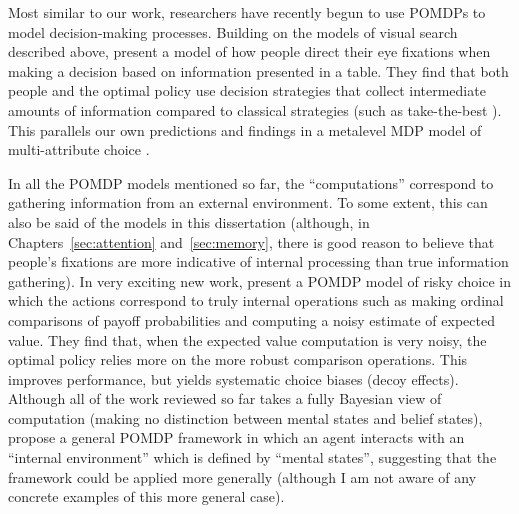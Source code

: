 Most similar to our work, researchers have recently begun to use POMDPs to model decision-making processes. Building on the models of visual search described above, \citet{chen2017cognitive} present a model of how people direct their eye fixations when making a decision based on information presented in a table. They find that both people and the optimal policy use decision strategies that collect intermediate amounts of information compared to classical strategies (such as take-the-best \citealp{gigerenzer1996reasoning}). This parallels our own predictions and findings in a metalevel MDP model of multi-attribute choice \citep{gul2018discovering}.

In all the POMDP models mentioned so far, the ``computations'' correspond to gathering information from an external environment. To some extent, this can also be said of the models in this dissertation (although, in Chapters~\ref{sec:attention} and~\ref{sec:memory}, there is good reason to believe that people's fixations are more indicative of internal processing than true information gathering). In very exciting new work, \citet{chen2021apparently} present a POMDP model of risky choice in which the actions correspond to truly internal operations such as making ordinal comparisons of payoff probabilities and computing a noisy estimate of expected value. They find that, when the expected value computation is very noisy, the optimal policy relies more on the more robust comparison operations. This improves performance, but yields systematic choice biases (decoy effects). Although all of the work reviewed so far takes a fully Bayesian view of computation (making no distinction between mental states and belief states), \citet{oulasvirta2022computational} propose a general POMDP framework in which an agent interacts with an ``internal environment'' which is defined by ``mental states'', suggesting that the framework could be applied more generally (although I am not aware of any concrete examples of this more general case).

